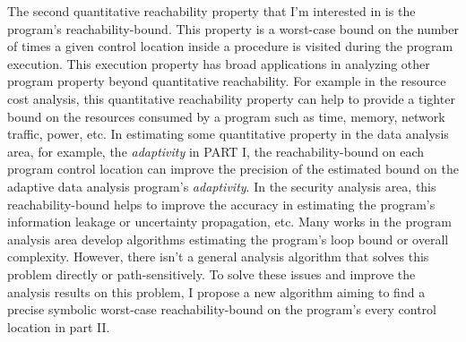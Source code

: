 \begin{abstractpage}
The second quantitative reachability property that I'm interested in is the program's reachability-bound.
This property is a worst-case bound on the number of times a given control location 
 inside a procedure is visited during the program execution.
This execution property has broad
applications in analyzing other program property beyond quantitative reachability.
For example in the resource cost analysis, this quantitative reachability property
can help to provide a tighter
bound on the resources consumed by a program such as time, memory,
network traffic, power, etc.
In estimating some quantitative property
in the data analysis area, for example, the \emph{adaptivity}
in PART I, the reachability-bound on each program control location
can improve the precision of the estimated bound on the adaptive data analysis program's \emph{adaptivity}.
In the security analysis area, this reachability-bound helps to improve the accuracy
in estimating the program's information leakage or uncertainty propagation, etc.
Many works in the program analysis area develop algorithms estimating the program's loop bound or overall complexity.
However, there isn't a general analysis algorithm that solves this problem directly or path-sensitively.
To solve these issues and improve the analysis results on this problem, I propose a new algorithm
aiming to find a precise symbolic worst-case reachability-bound on the program's every control location
in part II.




\end{abstractpage}
